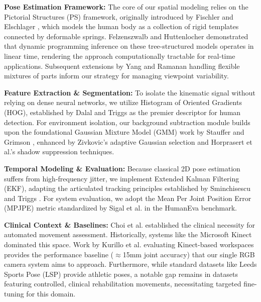 \documentclass[10pt, twocolumn, a4paper]{article}
\begin{document}
\textbf{Pose Estimation Framework:} The core of our spatial modeling relies on the Pictorial Structures (PS) framework, originally introduced by Fischler and Elschlager \cite{fischler1973representation}, which models the human body as a collection of rigid templates connected by deformable springs. Felzenszwalb and Huttenlocher \cite{felzenszwalb2005pictorial} demonstrated that dynamic programming inference on these tree-structured models operates in linear time, rendering the approach computationally tractable for real-time applications. Subsequent extensions by Yang and Ramanan \cite{yang2011articulated} handling flexible mixtures of parts inform our strategy for managing viewpoint variability.

\textbf{Feature Extraction \& Segmentation:} To isolate the kinematic signal without relying on dense neural networks, we utilize Histogram of Oriented Gradients (HOG), established by Dalal and Triggs \cite{dalal2005histograms} as the premier descriptor for human detection. For environment isolation, our background subtraction module builds upon the foundational Gaussian Mixture Model (GMM) work by Stauffer and Grimson \cite{stauffer1999adaptive}, enhanced by Zivkovic's \cite{zivkovic2004improved} adaptive Gaussian selection and Horprasert et al.'s \cite{horprasert1999statistical} shadow suppression techniques.

\textbf{Temporal Modeling \& Evaluation:} Because classical 2D pose estimation suffers from high-frequency jitter, we implement Extended Kalman Filtering (EKF), adapting the articulated tracking principles established by Sminchisescu and Triggs \cite{sminchisescu2004kinematic}. For system evaluation, we adopt the Mean Per Joint Position Error (MPJPE) metric standardized by Sigal et al. \cite{sigal2010humaneva} in the HumanEva benchmark. 

\textbf{Clinical Context \& Baselines:} Choi et al. \cite{choi2017exergame} established the clinical necessity for automated movement assessment. Historically, systems like the Microsoft Kinect \cite{shotton2011real} dominated this space. Work by Kurillo et al. \cite{kurillo2013kinect} evaluating Kinect-based workspaces provides the performance baseline ($\approx$15mm joint accuracy) that our single RGB camera system aims to approach. Furthermore, while standard datasets like Leeds Sports Pose (LSP) provide athletic poses, a notable gap remains in datasets featuring controlled, clinical rehabilitation movements, necessitating targeted fine-tuning for this domain.
\end{document}
